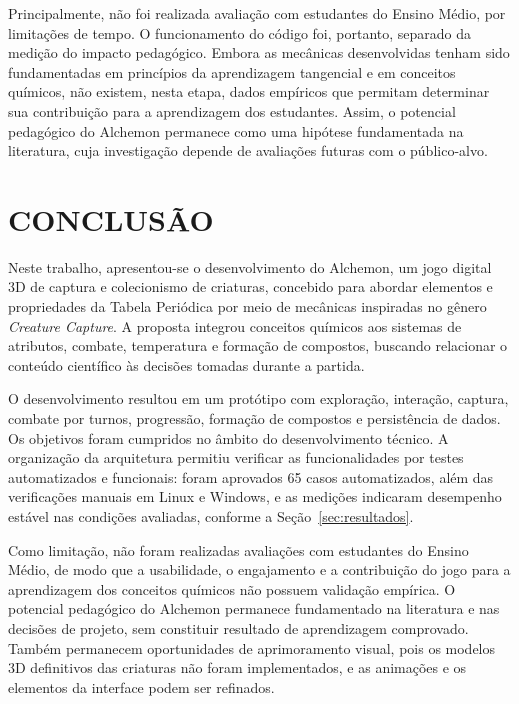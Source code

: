 Principalmente, não foi realizada avaliação com estudantes do Ensino Médio, por limitações de tempo. O funcionamento do código foi, portanto, separado da medição do impacto pedagógico. Embora as mecânicas desenvolvidas tenham sido fundamentadas em princípios da aprendizagem tangencial e em conceitos químicos, não existem, nesta etapa, dados empíricos que permitam determinar sua contribuição para a aprendizagem dos estudantes. Assim, o potencial pedagógico do Alchemon permanece como uma hipótese fundamentada na literatura, cuja investigação depende de avaliações futuras com o público-alvo.


\section{CONCLUSÃO}
\label{sec:conclusao}
Neste trabalho, apresentou-se o desenvolvimento do Alchemon, um jogo digital 3D de captura e colecionismo de criaturas, concebido para abordar elementos e propriedades da Tabela Periódica por meio de mecânicas inspiradas no gênero \textit{Creature Capture}. A proposta integrou conceitos químicos aos sistemas de atributos, combate, temperatura e formação de compostos, buscando relacionar o conteúdo científico às decisões tomadas durante a partida.

O desenvolvimento resultou em um protótipo com exploração, interação, captura, combate por turnos, progressão, formação de compostos e persistência de dados. Os objetivos foram cumpridos no âmbito do desenvolvimento técnico. A organização da arquitetura permitiu verificar as funcionalidades por testes automatizados e funcionais: foram aprovados 65 casos automatizados, além das verificações manuais em Linux e Windows, e as medições indicaram desempenho estável nas condições avaliadas, conforme a Seção~\ref{sec:resultados}.

Como limitação, não foram realizadas avaliações com estudantes do Ensino Médio, de modo que a usabilidade, o engajamento e a contribuição do jogo para a aprendizagem dos conceitos químicos não possuem validação empírica. O potencial pedagógico do Alchemon permanece fundamentado na literatura e nas decisões de projeto, sem constituir resultado de aprendizagem comprovado. Também permanecem oportunidades de aprimoramento visual, pois os modelos 3D definitivos das criaturas não foram implementados, e as animações e os elementos da interface podem ser refinados.

